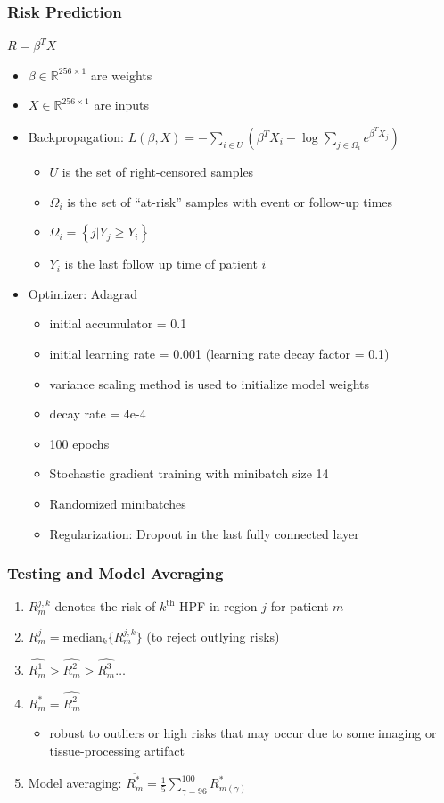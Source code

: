 \documentclass[usenames,dvipsnames]{beamer}
\begin{document}
\begin{frame}
  \frametitle{Risk Prediction}
  $R=\beta^{T}X$
  \begin{itemize}
    \item $\beta \in \mathbb{R}^{256 \times 1}$ are weights
    \item $X \in \mathbb{R}^{256 \times 1}$ are inputs
    \item Backpropagation:
    $L(\beta, X)=-\sum_{i \in U}\left(\beta^{T} X_{i}-\log \sum_{j \in \Omega_{i}} e^{\beta^{T} X_{j}}\right)$
    \begin{itemize}
      \item $U$ is the set of right-censored samples
      \item $\Omega_{i}$ is the set of ``at-risk'' samples with event or follow-up times
      \item $\Omega_{i}=\left\{j | Y_{j} \geq Y_{i}\right\}$
      \item $Y_{i}$ is the last follow up time of patient $i$
    \end{itemize}
    \item Optimizer: Adagrad
    \begin{itemize}
      \item initial accumulator = 0.1
      \item initial learning rate = 0.001 (learning rate decay factor = 0.1)
      \item variance scaling method is used to initialize model weights
      \item decay rate = 4e-4
      \item 100 epochs
      \item Stochastic gradient training with minibatch size 14
      \item Randomized minibatches
      \item Regularization: Dropout in the last fully connected layer
    \end{itemize}
  \end{itemize}
\end{frame}
\begin{frame}
  \frametitle{Testing and Model Averaging}
  \begin{enumerate}
    \item $R_{m}^{j,k}$ denotes the risk of $k^{{\text{th}}}$ HPF in region $j$
    for patient $m$
    \item $R_{m}^{j}=\text{median}_{k}{\{R_{m}^{j,k}\}}$ (to reject outlying
    risks)
    \item $\widehat{R_{m}^{1}}>\widehat{R_{m}^{2}}>\widehat{R_{m}^{3}} \ldots$
    \item $R_{m}^{*}=\widehat{R_{m}^{2}}$
    \begin{itemize}
      \item robust to outliers or high risks that may occur due to some imaging or tissue-processing artifact
    \end{itemize}
    \item Model averaging: $\overline{R_{m}^{*}}=\frac{1}{5} \sum_{\gamma=96}^{100} R_{m(\gamma)}^{*}$
  \end{enumerate}
\end{frame}
\end{document}
